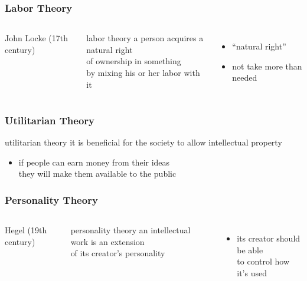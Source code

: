 \documentclass[dvipsnames]{beamer}
\theoremstyle{plain}
\begin{document}
\begin{frame}
  \frametitle{Labor Theory}

  \begin{columns}
    \begin{center}

      John Locke (17th century)
    \end{center}

    \begin{block}{labor theory}
        a person acquires a natural right\\
        of ownership in something\\
        by mixing his or her labor with it
    \end{block}
    \begin{itemize}
      \item ``natural right''
      \item not take more than needed
    \end{itemize}
  \end{columns}
\end{frame}

\begin{frame}
  \frametitle{Utilitarian Theory}

  \begin{block}{utilitarian theory}
    it is beneficial for the society to allow intellectual property
  \end{block}

  \begin{itemize}
    \item if people can earn money from their ideas\\
      they will make them available to the public
  \end{itemize}
\end{frame}

\begin{frame}
  \frametitle{Personality Theory}

  \begin{columns}
    \begin{center}

      Hegel (19th century)
    \end{center}

    \begin{block}{personality theory}
      an intellectual work is an extension\\
      of its creator's personality
    \end{block}

    \begin{itemize}
      \item its creator should be able\\
        to control how it's used
    \end{itemize}
  \end{columns}
\end{frame}
\end{document}
